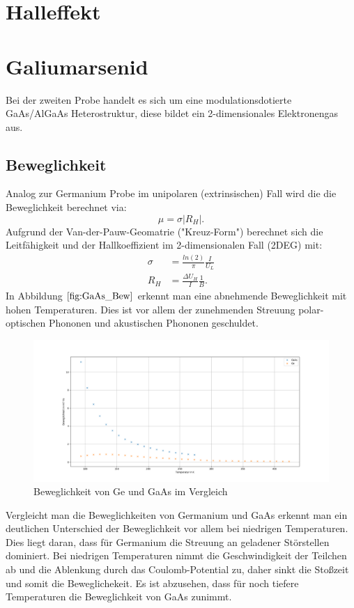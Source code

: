 
\section{Halleffekt}

\section{Galiumarsenid}
Bei der zweiten Probe handelt es sich um eine modulationsdotierte GaAs/AlGaAs Heterostruktur, diese bildet ein 2-dimensionales Elektronengas aus. 
\subsection{Beweglichkeit}
Analog zur Germanium Probe im unipolaren (extrinsischen) Fall wird die die Beweglichkeit berechnet via:
\begin{equation}
    \mu = \sigma |R_H|.
\end{equation}
Aufgrund der Van-der-Pauw-Geomatrie ("Kreuz-Form") berechnet sich die Leitfähigkeit und der Hallkoeffizient im 2-dimensionalen Fall (2DEG) mit:
\begin{align}
    \sigma &= \frac{ln(2)}{\pi} \frac{I}{U_L} \\
    R_H &= \frac{\Delta U_H}{I} \frac{1}{B}.
\end{align}
In Abbildung $\autoref{fig:GaAs_Bew}$ erkennt man eine abnehmende Beweglichkeit mit hohen Temperaturen. Dies ist vor allem der zunehmenden Streuung polar-optischen Phononen und akustischen Phononen geschuldet.  
\begin{figure}
    \centering
    \includegraphics[width=1.0\textwidth]{./fig/GaAs_bew.png}
    \caption{Beweglichkeit von Ge und GaAs im Vergleich}
    \label{fig:GaAs_Bew}
\end{figure}

Vergleicht man die Beweglichkeiten von Germanium und GaAs erkennt man ein deutlichen Unterschied der Beweglichkeit vor allem bei niedrigen Temperaturen. Dies liegt daran, dass für Germanium die Streuung an geladener Störstellen dominiert. Bei niedrigen Temperaturen nimmt die Geschwindigkeit der Teilchen ab und die Ablenkung durch das Coulomb-Potential zu, daher sinkt die Stoßzeit und somit die Beweglichekeit. 
Es ist abzusehen, dass für noch tiefere Temperaturen die Beweglichkeit von GaAs zunimmt.

